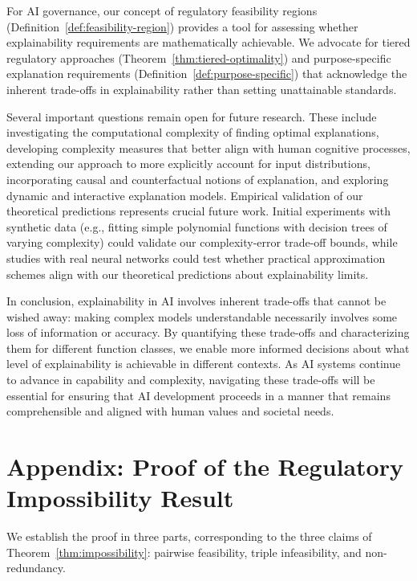 \documentclass[11pt,letter,leqno]{article}
\begin{document}
For AI governance, our concept of regulatory feasibility regions (Definition~\ref{def:feasibility-region}) provides a tool for assessing whether explainability requirements are mathematically achievable.  We advocate for tiered regulatory approaches (Theorem~\ref{thm:tiered-optimality}) and purpose-specific explanation requirements (Definition~\ref{def:purpose-specific}) that acknowledge the inherent trade-offs in explainability rather than setting unattainable standards.

Several important questions remain open for future research.  These include investigating the computational complexity of finding optimal explanations, developing complexity measures that better align with human cognitive processes, extending our approach to more explicitly account for input distributions, incorporating causal and counterfactual notions of explanation, and exploring dynamic and interactive explanation models.  Empirical validation of our theoretical predictions represents crucial future work. Initial experiments with synthetic data (e.g., fitting simple polynomial functions with decision trees of varying complexity) could validate our complexity-error trade-off bounds, while studies with real neural networks could test whether practical approximation schemes align with our theoretical predictions about explainability limits.

In conclusion, explainability in AI involves inherent trade-offs that cannot be wished away: making complex models understandable necessarily involves some loss of information or accuracy.  By quantifying these trade-offs and characterizing them for different function classes, we enable more informed decisions about what level of explainability is achievable in different contexts.   As AI systems continue to advance in capability and complexity, navigating these trade-offs will be essential for ensuring that AI development proceeds in a manner that remains comprehensible and aligned with human values and societal needs.

\appendix
\renewcommand{\thesection}{}
\section{Appendix: Proof of the Regulatory Impossibility Result}

We establish the proof in three parts, corresponding to the three claims of 
Theorem~\ref{thm:impossibility}: pairwise feasibility, triple infeasibility, 
and non-redundancy.
\end{document}
